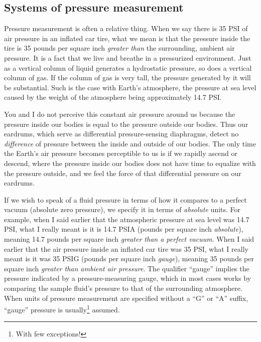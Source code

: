 \filbreak
\subsection{Systems of pressure measurement}

Pressure measurement is often a relative thing.  When we say there is 35 PSI of air pressure in an inflated car tire, what we mean is that the pressure inside the tire is 35 pounds per square inch \textit{greater than} the surrounding, ambient air pressure.  It is a fact that we live and breathe in a pressurized environment.  Just as a vertical column of liquid generates a hydrostatic pressure, so does a vertical column of gas.  If the column of gas is very tall, the pressure generated by it will be substantial.  Such is the case with Earth's atmosphere, the pressure at sea level caused by the weight of the atmosphere being approximately 14.7 PSI.

You and I do not perceive this constant air pressure around us because the pressure inside our bodies is equal to the pressure outside our bodies.  Thus our eardrums, which serve as differential pressure-sensing diaphragms, detect no \textit{difference} of pressure between the inside and outside of our bodies.  The only time the Earth's air pressure becomes perceptible to us is if we rapidly ascend or descend, where the pressure inside our bodies does not have time to equalize with the pressure outside, and we feel the force of that differential pressure on our eardrums.  

If we wish to speak of a fluid pressure in terms of how it compares to a perfect vacuum (absolute zero pressure), we specify it in terms of \textit{absolute} units.  For example, when I said earlier that the atmospheric pressure at sea level was 14.7 PSI, what I really meant is it is 14.7 PSIA (pounds per square inch \textit{absolute}), meaning 14.7 pounds per square inch \textit{greater than a perfect vacuum}.  When I said earlier that the air pressure inside an inflated car tire was 35 PSI, what I really meant is it was 35 PSIG (pounds per square inch \textit{gauge}), meaning 35 pounds per square inch \textit{greater than ambient air pressure}.  The qualifier ``gauge'' implies the pressure indicated by a pressure-measuring gauge, which in most cases works by comparing the sample fluid's pressure to that of the surrounding atmosphere.  When units of pressure measurement are specified without a ``G'' or ``A'' suffix, ``gauge'' pressure is usually\footnote{With few exceptions!} assumed.        

